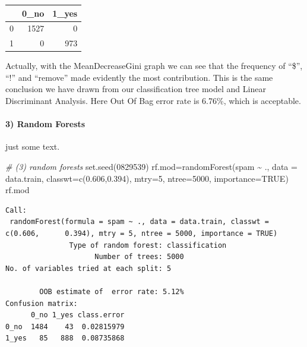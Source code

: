 \documentclass[
  11pt,
]{article}
\newenvironment{Shaded}{\begin{snugshade}}{\end{snugshade}}
\newcommand{\AttributeTok}[1]{\textcolor[rgb]{0.77,0.63,0.00}{#1}}
\newcommand{\CommentTok}[1]{\textcolor[rgb]{0.56,0.35,0.01}{\textit{#1}}}
\newcommand{\ConstantTok}[1]{\textcolor[rgb]{0.00,0.00,0.00}{#1}}
\newcommand{\DecValTok}[1]{\textcolor[rgb]{0.00,0.00,0.81}{#1}}
\newcommand{\FloatTok}[1]{\textcolor[rgb]{0.00,0.00,0.81}{#1}}
\newcommand{\FunctionTok}[1]{\textcolor[rgb]{0.00,0.00,0.00}{#1}}
\newcommand{\NormalTok}[1]{#1}
\newcommand{\OtherTok}[1]{\textcolor[rgb]{0.56,0.35,0.01}{#1}}
\newcommand{\SpecialCharTok}[1]{\textcolor[rgb]{0.00,0.00,0.00}{#1}}
\begin{document}
\begin{tabular}[t]{l|r|r}
\hline
  & 0\_no & 1\_yes\\
\hline
0 & 1527 & 0\\
\hline
1 & 0 & 973\\
\hline
\end{tabular}

\begin{Shaded}
\end{Shaded}

Actually, with the MeanDecreaseGini graph we can see that the frequency of ``\$'', ``!'' and ``remove'' made evidently the most contribution. This is the same conclusion we have drawn from our classification tree model and Linear Discriminant Analysis. Here Out Of Bag error rate is 6.76\%, which is acceptable.

\hypertarget{random-forests}{%
\paragraph{3) Random Forests}\label{random-forests}}

just some text.

\begin{Shaded}
\begin{Highlighting}[]
\CommentTok{\# (3) random forests}
\FunctionTok{set.seed}\NormalTok{(}\DecValTok{0829539}\NormalTok{)}
\NormalTok{rf.mod}\OtherTok{=}\FunctionTok{randomForest}\NormalTok{(spam }\SpecialCharTok{\textasciitilde{}}\NormalTok{ ., }\AttributeTok{data =}\NormalTok{ data.train, }
                    \AttributeTok{classwt=}\FunctionTok{c}\NormalTok{(}\FloatTok{0.606}\NormalTok{,}\FloatTok{0.394}\NormalTok{), }\AttributeTok{mtry=}\DecValTok{5}\NormalTok{, }
                    \AttributeTok{ntree=}\DecValTok{5000}\NormalTok{, }\AttributeTok{importance=}\ConstantTok{TRUE}\NormalTok{)}
\NormalTok{rf.mod}
\end{Highlighting}
\end{Shaded}

\begin{verbatim}
Call:
 randomForest(formula = spam ~ ., data = data.train, classwt = c(0.606,      0.394), mtry = 5, ntree = 5000, importance = TRUE) 
               Type of random forest: classification
                     Number of trees: 5000
No. of variables tried at each split: 5

        OOB estimate of  error rate: 5.12%
Confusion matrix:
      0_no 1_yes class.error
0_no  1484    43  0.02815979
1_yes   85   888  0.08735868
\end{verbatim}
\end{document}
